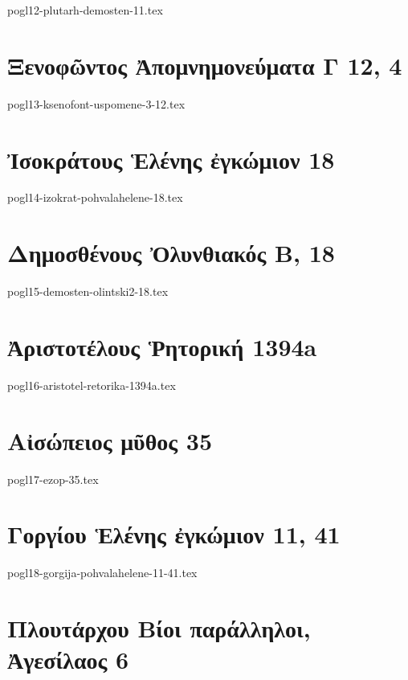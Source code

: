 \documentclass[a4paper,12pt,twoside]{report}
\begin{document}
{pogl12-plutarh-demosten-11.tex}

\chapter[Ξενοφῶντος Ἀπομνημονεύματα Γ]{\textgreek[variant=ancient]{Ξενοφῶντος Ἀπομνημονεύματα Γ} 12, 4}

{pogl13-ksenofont-uspomene-3-12.tex}

\chapter[Ἰσοκράτους Ἑλένης ἐγκώμιον]{\textgreek[variant=ancient]{Ἰσοκράτους Ἑλένης ἐγκώμιον} 18}

{pogl14-izokrat-pohvalahelene-18.tex}

\chapter[Δημοσθένους Ὀλυνθιακός Β]{\textgreek[variant=ancient]{Δημοσθένους Ὀλυνθιακός Β,} 18}

{pogl15-demosten-olintski2-18.tex}

\chapter[Ἀριστοτέλους Ῥητορική]{\textgreek[variant=ancient]{Ἀριστοτέλους Ῥητορική} 1394a}

{pogl16-aristotel-retorika-1394a.tex}

\chapter[Αἰσώπειος μῦθος 35]{\textgreek[variant=ancient]{Αἰσώπειος μῦθος} 35}

{pogl17-ezop-35.tex}

\chapter[Γοργίου Ἑλένης ἐγκώμιον 11, 41]{\textgreek[variant=ancient]{Γοργίου Ἑλένης ἐγκώμιον} 11, 41}

{pogl18-gorgija-pohvalahelene-11-41.tex}

\chapter[Πλουτάρχου Ἀγεσίλαος]{\textgreek[variant=ancient]{Πλουτάρχου Βίοι παράλληλοι, \\Ἀγεσίλαος} 6}
\end{document}
